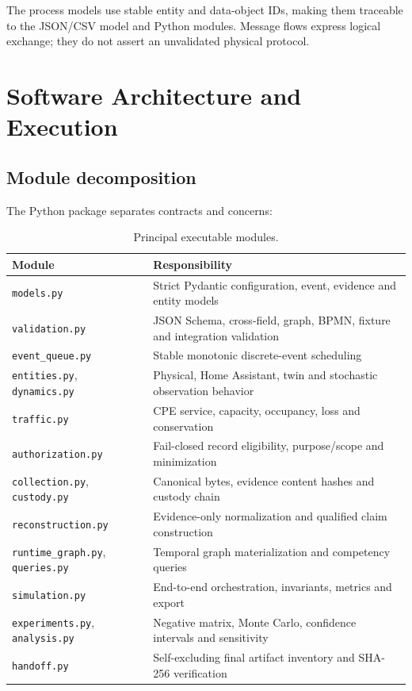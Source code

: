﻿\documentclass[11pt,a4paper]{article}
\newcommand{\code}[1]{\texttt{#1}}
\begin{document}
The process models use stable entity and data-object IDs, making them traceable to the JSON/CSV model and Python modules. Message flows express logical exchange; they do not assert an unvalidated physical protocol.

\section{Software Architecture and Execution}

\subsection{Module decomposition}

The Python package separates contracts and concerns:

\begin{table}[H]
\centering
\caption{Principal executable modules.}
\begin{tabularx}{\textwidth}{@{}l X@{}}
\toprule
Module & Responsibility \\
\midrule
\code{models.py} & Strict Pydantic configuration, event, evidence and entity models \\
\code{validation.py} & JSON Schema, cross-field, graph, BPMN, fixture and integration validation \\
\code{event\_queue.py} & Stable monotonic discrete-event scheduling \\
\code{entities.py}, \code{dynamics.py} & Physical, Home Assistant, twin and stochastic observation behavior \\
\code{traffic.py} & CPE service, capacity, occupancy, loss and conservation \\
\code{authorization.py} & Fail-closed record eligibility, purpose/scope and minimization \\
\code{collection.py}, \code{custody.py} & Canonical bytes, evidence content hashes and custody chain \\
\code{reconstruction.py} & Evidence-only normalization and qualified claim construction \\
\code{runtime\_graph.py}, \code{queries.py} & Temporal graph materialization and competency queries \\
\code{simulation.py} & End-to-end orchestration, invariants, metrics and export \\
\code{experiments.py}, \code{analysis.py} & Negative matrix, Monte Carlo, confidence intervals and sensitivity \\
\code{handoff.py} & Self-excluding final artifact inventory and SHA-256 verification \\
\bottomrule
\end{tabularx}
\end{table}
\end{document}
